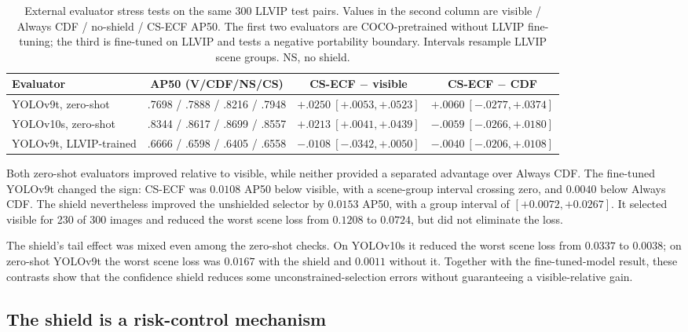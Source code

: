 \documentclass[preprint,11pt]{elsarticle}
\begin{document}
\begin{table}[t]
\centering
\scriptsize
\setlength{\tabcolsep}{3pt}
\caption{External evaluator stress tests on the same 300 LLVIP test pairs.
Values in the second column are visible / Always CDF / no-shield / CS-ECF AP50.
The first two evaluators are COCO-pretrained without LLVIP fine-tuning; the
third is fine-tuned on LLVIP and tests a negative portability boundary.
Intervals resample LLVIP scene groups. NS, no shield.}
\label{tab:independent}
\begin{tabular}{@{}lccc@{}}
\toprule
Evaluator & AP50 (V/CDF/NS/CS) &
CS-ECF \(-\) visible & CS-ECF \(-\) CDF \\
\midrule
YOLOv9t, zero-shot & .7698 / .7888 / .8216 / .7948 &
\(+.0250~[+.0053,+.0523]\) & \(+.0060~[-.0277,+.0374]\) \\
YOLOv10s, zero-shot & .8344 / .8617 / .8699 / .8557 &
\(+.0213~[+.0041,+.0439]\) & \(-.0059~[-.0266,+.0180]\) \\
YOLOv9t, LLVIP-trained & .6666 / .6598 / .6405 / .6558 &
\(-.0108~[-.0342,+.0050]\) & \(-.0040~[-.0206,+.0108]\) \\
\bottomrule
\end{tabular}
\end{table}

Both zero-shot evaluators improved relative to visible, while neither provided
a separated advantage over Always CDF. The fine-tuned YOLOv9t changed the sign:
CS-ECF was \(0.0108\) AP50 below visible, with a scene-group interval crossing
zero, and \(0.0040\) below Always CDF. The shield nevertheless improved the
unshielded selector by \(0.0153\) AP50, with a group interval of
\([+0.0072,+0.0267]\). It selected visible for 230 of 300 images and reduced
the worst scene loss from \(0.1208\) to \(0.0724\), but did not eliminate the
loss.

The shield's tail effect was mixed even among the zero-shot checks. On
YOLOv10s it reduced the worst scene loss from \(0.0337\) to \(0.0038\);
on zero-shot YOLOv9t the worst scene loss was \(0.0167\) with the shield and
\(0.0011\) without it. Together with the fine-tuned-model result, these
contrasts show that the confidence shield reduces some unconstrained-selection
errors without guaranteeing a visible-relative gain.

\subsection{The shield is a risk-control mechanism}
\end{document}
